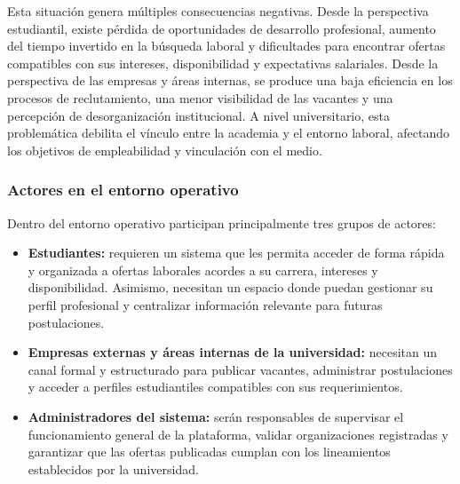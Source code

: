 \documentclass[11pt,a4paper]{Plantilla}
\begin{document}
\vspace{0.3cm}

Esta situación genera múltiples consecuencias negativas. Desde la perspectiva estudiantil, existe pérdida de oportunidades de desarrollo profesional, aumento del tiempo invertido en la búsqueda laboral y dificultades para encontrar ofertas compatibles con sus intereses, disponibilidad y expectativas salariales. Desde la perspectiva de las empresas y áreas internas, se produce una baja eficiencia en los procesos de reclutamiento, una menor visibilidad de las vacantes y una percepción de desorganización institucional. A nivel universitario, esta problemática debilita el vínculo entre la academia y el entorno laboral, afectando los objetivos de empleabilidad y vinculación con el medio.

\vspace{0.3cm}

\subsubsection{Actores en el entorno operativo}

Dentro del entorno operativo participan principalmente tres grupos de actores:

\begin{itemize}
\item \textbf{Estudiantes:} requieren un sistema que les permita acceder de forma rápida y organizada a ofertas laborales acordes a su carrera, intereses y disponibilidad. Asimismo, necesitan un espacio donde puedan gestionar su perfil profesional y centralizar información relevante para futuras postulaciones.

\vspace{0.2cm}

\item \textbf{Empresas externas y áreas internas de la universidad:} necesitan un canal formal y estructurado para publicar vacantes, administrar postulaciones y acceder a perfiles estudiantiles compatibles con sus requerimientos.

\vspace{0.2cm}

\item \textbf{Administradores del sistema:} serán responsables de supervisar el funcionamiento general de la plataforma, validar organizaciones registradas y garantizar que las ofertas publicadas cumplan con los lineamientos establecidos por la universidad.


\end{itemize}
\end{document}
